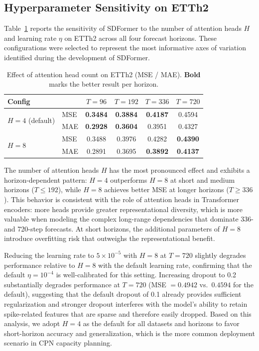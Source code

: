 \documentclass[journal]{IEEEtran}
\begin{document}
\subsection{Hyperparameter Sensitivity on ETTh2}

Table~\ref{tab:hyperparam} reports the sensitivity of SDFormer to the
number of attention heads $H$ and learning rate $\eta$ on ETTh2 across
all four forecast horizons.
These configurations were selected to represent the most informative axes
of variation identified during the development of SDFormer.

\begin{table}[!t]
\caption{Effect of attention head count on ETTh2 (MSE / MAE).
  \textbf{Bold} marks the better result per horizon.}
\label{tab:hyperparam}
\centering
\renewcommand{\arraystretch}{1.15}
\setlength{\tabcolsep}{4pt}
\begin{tabular}{llcccc}
\toprule
\textbf{Config} & & $T=96$ & $T=192$ & $T=336$ & $T=720$ \\
\midrule
\multirow{2}{*}{$H=4$ (default)}
  & MSE & \textbf{0.3484} & \textbf{0.3884} & \textbf{0.4187} & 0.4594 \\
  & MAE & \textbf{0.2928} & \textbf{0.3604} & 0.3951          & 0.4327 \\
\midrule
\multirow{2}{*}{$H=8$}
  & MSE & 0.3488 & 0.3976 & 0.4282          & \textbf{0.4390} \\
  & MAE & 0.2891 & 0.3695 & \textbf{0.3892} & \textbf{0.4137} \\
\bottomrule
\end{tabular}
\end{table}

The number of attention heads $H$ has the most pronounced effect and
exhibits a horizon-dependent pattern: $H=4$ outperforms $H=8$ at short
and medium horizons ($T \leq 192$), while $H=8$ achieves better MSE at
longer horizons ($T \geq 336$).
This behavior is consistent with the role of attention heads in
Transformer encoders: more heads provide greater representational
diversity, which is more valuable when modeling the complex long-range
dependencies that dominate 336- and 720-step forecasts.
At short horizons, the additional parameters of $H=8$ introduce overfitting
risk that outweighs the representational benefit.

Reducing the learning rate to $5 \times 10^{-5}$ with $H=8$ at $T=720$
slightly degrades performance relative to $H=8$ with the default learning
rate, confirming that the default $\eta = 10^{-4}$ is well-calibrated for
this setting.
Increasing dropout to 0.2 substantially degrades performance at $T=720$
(MSE $= 0.4942$ vs.\ $0.4594$ for the default), suggesting that the
default dropout of 0.1 already provides sufficient regularization and
stronger dropout interferes with the model's ability to retain spike-related
features that are sparse and therefore easily dropped.
Based on this analysis, we adopt $H=4$ as the default for all datasets and
horizons to favor short-horizon accuracy and generalization, which is the
more common deployment scenario in CPN capacity planning.
\end{document}
